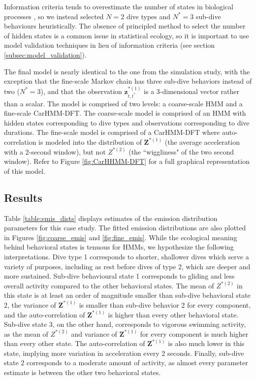 Information criteria tends to overestimate the number of states in biological processes \citep{Pohle:2017}, so we instead selected $N = 2$ dive types and $N^* = 3$ sub-dive behaviours heuristically. The absence of principled method to select the number of hidden states is a common issue in statistical ecology, so it is important to use model validation techniques in lieu of information criteria (see section \ref{subsec:model_validation}).

The final model is nearly identical to the one from the simulation study, with the exception that the fine-scale Markov chain has three sub-dive behaviors instead of two ($N^* = 3$), and that the observation $\mathbf{z}^{*(1)}_{t,t^*}$ is a 3-dimensional vector rather than a scalar. The model is comprised of two levels: a coarse-scale HMM and a fine-scale CarHMM-DFT. The coarse-scale model is comprised of an HMM with hidden states corresponding to dive types and observations corresponding to dive durations. The fine-scale model is comprised of a CarHMM-DFT where auto-correlation is modeled into the distribution of $\mathbf{Z}^{*(1)}$ (the average acceleration with a 2-second window), but not $Z^{*(2)}$ (the ``wiggliness" of the two second window). Refer to Figure \ref{fig:CarHHMM-DFT} for a full graphical representation of this model.

\subsection{Results}

Table \ref{table:emis_dists} displays estimates of the emission distribution parameters for this case study. The fitted emission distributions are also plotted in Figures \ref{fig:coarse_emis} and \ref{fig:fine_emis}. While the ecological meaning behind behavioral states is tenuous for HMMs, we hypothesize the following interpretations. Dive type 1 corresponds to shorter, shallower dives which serve a variety of purposes, including as rest before dives of type 2, which are deeper and more sustained. Sub-dive behavioural state 1 corresponds to gliding and less overall activity compared to the other behavioral states. The mean of $Z^{*(2)}$ in this state is at least an order of magnitude smaller than sub-dive behavioral state 2, the variance of $\mathbf{Z}^{*(1)}$ is smaller than sub-dive behavior 2 for every component, and the auto-correlation of $\mathbf{Z}^{*(1)}$ is higher than every other behavioral state. Sub-dive state 3, on the other hand, corresponds to vigorous swimming activity, as the mean of $Z^{*(2)}$ and variance of $\mathbf{Z}^{*(1)}$ for every component is much higher than every other state. The auto-correlation of $\mathbf{Z}^{*(1)}$ is also much lower in this state, implying more variation in acceleration every 2 seconds. Finally, sub-dive state 2 corresponds to a moderate amount of activity, as almost every parameter estimate is between the other two behavioral states.

